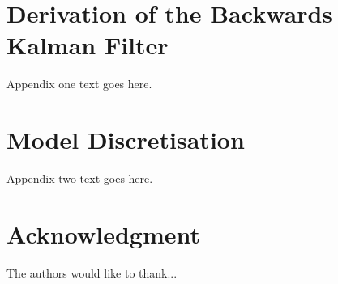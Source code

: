 \documentclass[journal]{IEEEtran}
\begin{document}
\appendices
\section{Derivation of the Backwards Kalman Filter}
Appendix one text goes here.

\section{Model Discretisation}
Appendix two text goes here.


\section*{Acknowledgment}


The authors would like to thank...


\ifCLASSOPTIONcaptionsoff
  \newpage
\fi





%
%
%



% 
\end{document}
